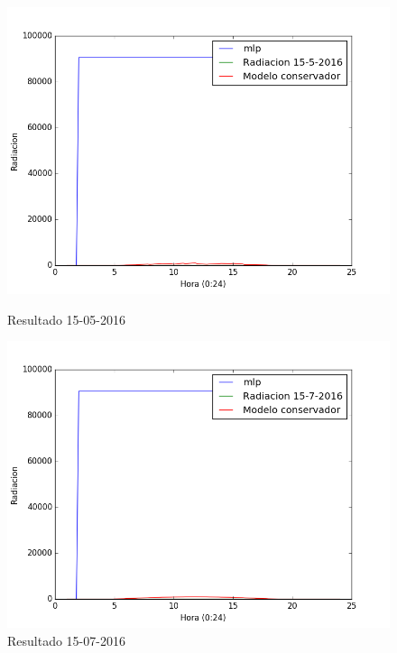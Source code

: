 \begin{figure}[htb]
		\includegraphics[width=\linewidth]{figures/mlp_2016051520160515.png}
		\caption{Resultado 15-05-2016 \label{resultado_mlp_3}}
\endminipage\hfill
{}
		\includegraphics[width=\linewidth]{figures/mlp_2016071520160715.png}
		\caption{Resultado 15-07-2016 \label{resultado_mlp_4}}
\endminipage\hfill
\end{figure}

